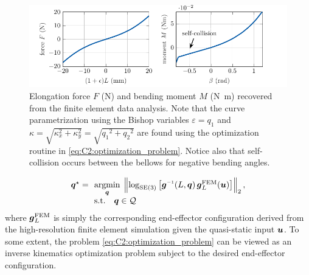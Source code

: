 \begin{figure}[!t]
 \vspace{-1mm}
  \hspace{-2mm}
  \includegraphics*{./pdf/thesis-figure-4-7.pdf}
  \caption{\small Elongation force $F$ (\si{\newton}) and bending moment $M$ (\si{\newton \meter}) recovered from the finite element data analysis. Note that the curve parametrization using the Bishop variables $ \varepsilon = q_1$ and $\kappa = \sqrt{ \kappa_x^2 +  \kappa_y^2} = \sqrt{ {q_1}^2 +  {q_2}^2}$ are found using the optimization routine in \eqref{eq:C2:optimization_problem}. Notice also that self-collision occurs between the bellows for negative bending angles.}
  \vspace{-0.4cm}
  \label{fig:C2:fem_stress}
\end{figure}

%
\begin{align}
\begin{array}{ll}
\q^\star = & \!\!\underset{\q}{\textrm{argmin}}\; \left \lVert \log_{\SE{3}}\left[ \gB\inv(L,\q)\,\gB_L^{\textrm{FEM}}(\vec{u}) \right] \right \rVert_2,\\
& \!\!\textrm{s.t.} \quad \q \in \mathcal{Q} 
\end{array}
\label{eq:C2:optimization_problem}
\end{align}
%
where ${\boldsymbol{g}}_L^{\textrm{FEM}}$ is simply the corresponding end-effector configuration derived from the high-resolution finite element simulation given the quasi-static input ${\boldsymbol{u}}$. To some extent, the problem \eqref{eq:C2:optimization_problem} can be viewed as an inverse kinematics optimization problem subject to the desired end-effector configuration.

